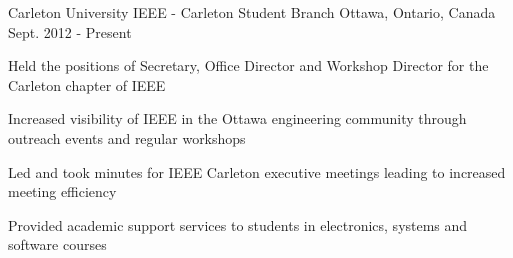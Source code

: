 

\begin{cventries}

  \cventry
    {Carleton University} %
    {IEEE - Carleton Student Branch} %
    {Ottawa, Ontario, Canada} %
    {Sept. 2012 - Present} %
    {
      \begin{cvitems} %
        \item {Held the positions of Secretary, Office Director and Workshop Director for the Carleton chapter of IEEE}
        \item {Increased visibility of IEEE in the Ottawa engineering community through outreach events and regular workshops}
        \item {Led and took minutes for IEEE Carleton executive meetings leading to increased meeting efficiency}
        \item {Provided academic support services to students in electronics, systems and software courses}
      \end{cvitems}
    }

\end{cventries}
